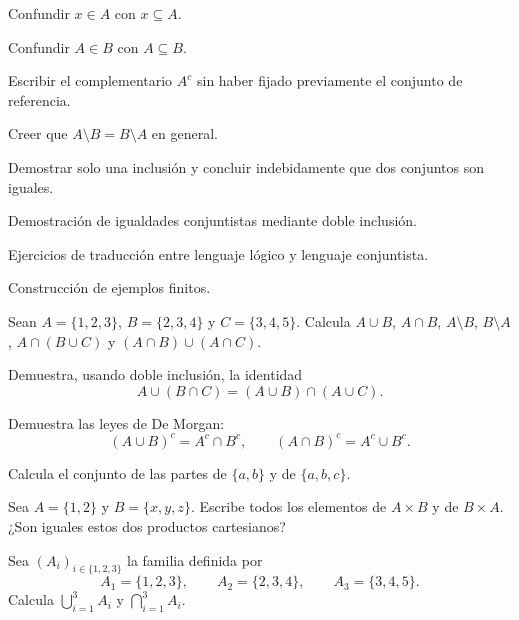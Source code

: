 \begin{erroresfrecuentes}
  \item Confundir \(x\in A\) con \(x\subseteq A\).
  \item Confundir \(A\in B\) con \(A\subseteq B\).
  \item Escribir el complementario \(A^c\) sin haber fijado previamente el conjunto de referencia.
  \item Creer que \(A\setminus B = B\setminus A\) en general.
  \item Demostrar solo una inclusión y concluir indebidamente que dos conjuntos son iguales.
\end{erroresfrecuentes}

\begin{seminario}
  \item Demostración de igualdades conjuntistas mediante doble inclusión.
  \item Ejercicios de traducción entre lenguaje lógico y lenguaje conjuntista.
  \item Construcción de ejemplos finitos.
\end{seminario}

\begin{ejerciciospropuestos}
  \item Sean \(A=\{1,2,3\}\), \(B=\{2,3,4\}\) y \(C=\{3,4,5\}\). Calcula \(A\cup B\), \(A\cap B\), \(A\setminus B\), \(B\setminus A\), \(A\cap(B\cup C)\) y \((A\cap B)\cup(A\cap C)\).
  \item Demuestra, usando doble inclusión, la identidad
  \[
    A\cup(B\cap C)=(A\cup B)\cap(A\cup C).
  \]
  \item Demuestra las leyes de De Morgan:
  \[
    (A\cup B)^c=A^c\cap B^c,
    \qquad
    (A\cap B)^c=A^c\cup B^c.
  \]
  \item Calcula el conjunto de las partes de \(\{a,b\}\) y de \(\{a,b,c\}\).
  \item Sea \(A=\{1,2\}\) y \(B=\{x,y,z\}\). Escribe todos los elementos de \(A\times B\) y de \(B\times A\). ¿Son iguales estos dos productos cartesianos?
  \item Sea \((A_i)_{i\in\{1,2,3\}}\) la familia definida por
  \[
    A_1=\{1,2,3\},\qquad A_2=\{2,3,4\},\qquad A_3=\{3,4,5\}.
  \]
  Calcula \(\bigcup_{i=1}^3 A_i\) y \(\bigcap_{i=1}^3 A_i\).
\end{ejerciciospropuestos}

